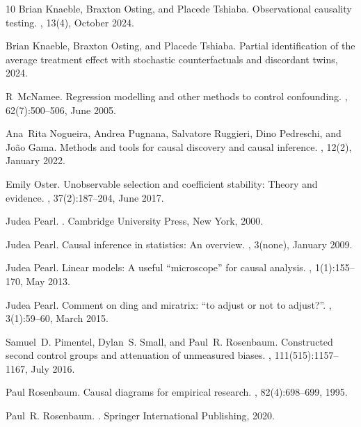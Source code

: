 \documentclass[11pt]{amsart}
\begin{document}
\begin{thebibliography}{10}
Brian Knaeble, Braxton Osting, and Placede Tshiaba.
\newblock Observational causality testing.
, 13(4), October 2024.

Brian Knaeble, Braxton Osting, and Placede Tshiaba.
\newblock Partial identification of the average treatment effect with stochastic counterfactuals and discordant twins, 2024.

R~McNamee.
\newblock Regression modelling and other methods to control confounding.
, 62(7):500–506, June 2005.

Ana~Rita Nogueira, Andrea Pugnana, Salvatore Ruggieri, Dino Pedreschi, and João Gama.
\newblock Methods and tools for causal discovery and causal inference.
, 12(2), January 2022.

Emily Oster.
\newblock Unobservable selection and coefficient stability: Theory and evidence.
, 37(2):187–204, June 2017.

Judea Pearl.
.
\newblock Cambridge University Press, New York, 2000.

Judea Pearl.
\newblock Causal inference in statistics: An overview.
, 3(none), January 2009.

Judea Pearl.
\newblock Linear models: A useful “microscope” for causal analysis.
, 1(1):155–170, May 2013.

Judea Pearl.
\newblock Comment on ding and miratrix: {\textquotedblleft}to adjust or not to adjust?{\textquotedblright}.
, 3(1):59--60, March 2015.

Samuel~D. Pimentel, Dylan~S. Small, and Paul~R. Rosenbaum.
\newblock Constructed second control groups and attenuation of unmeasured biases.
, 111(515):1157--1167, July 2016.

Paul Rosenbaum.
\newblock Causal diagrams for empirical research.
, 82(4):698--699, 1995.

Paul~R. Rosenbaum.
.
\newblock Springer International Publishing, 2020.


\end{thebibliography}
\end{document}
